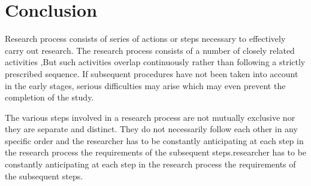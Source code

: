 \chapter{Conclusion}
Research process consists of series of actions or steps necessary to effectively carry out research. The research process consists of a number of closely related activities ,But such activities overlap continuously rather than following a strictly  prescribed sequence. If subsequent procedures have not been taken into account in the early stages, serious difficulties may arise which may even prevent the completion of the study. 

The various steps involved in a research process are not mutually exclusive  nor they are separate and distinct. They do not necessarily follow each other in any specific order and the researcher has to be constantly anticipating at each step in the research process the requirements of the subsequent steps.researcher has to be constantly anticipating at each step in the research process the requirements of the subsequent steps.


















